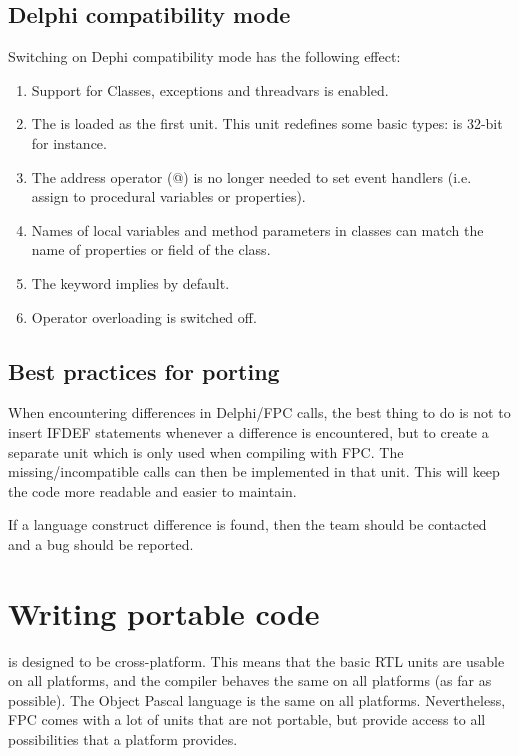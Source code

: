 \subsection{Delphi compatibility mode}
Switching on Dephi compatibility mode has the following effect:
\begin{enumerate}
\item Support for Classes, exceptions and threadvars is enabled.
\item The  is loaded as the first unit. This unit redefines
some basic types:  is 32-bit for instance.
\item The address operator (@) is no longer needed to set event handlers
(i.e. assign to procedural variables or properties).
\item Names of local variables and method parameters in classes can match 
the name of properties or field of the class.
\item The  keyword implies  by default. 
\item Operator overloading is switched off.
\end{enumerate}

\subsection{Best practices for porting}

When encountering differences in Delphi/FPC calls, the best thing to 
do is not to insert IFDEF statements whenever a difference is 
encountered, but to create a separate unit which is only used 
when compiling with FPC. The missing/incompatible calls can 
then be implemented in that unit. This will keep the code more 
readable and easier to maintain.

If a language construct difference is found, then the \fpc team 
should be contacted and a bug should be reported.


\section{Writing portable code}

\fpc is designed to be cross-platform. This means that the basic RTL 
units are usable on all platforms, and the compiler behaves the same 
on all platforms (as far as possible).  The Object Pascal 
language is the same on all platforms. Nevertheless, FPC comes with a
lot of units that are not portable, but provide access to all 
possibilities that a platform provides.

